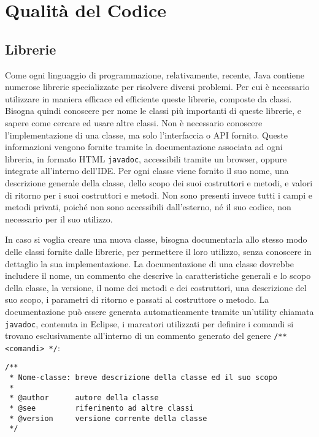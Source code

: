 \documentclass{article}
\numberwithin{equation}{subsection}
\begin{document}
\clearpage

\section{Qualità del Codice}

\subsection{Librerie}

Come ogni linguaggio di programmazione, relativamente, recente, Java contiene numerose librerie specializzate per risolvere diversi problemi. Per cui è necessario utilizzare in 
maniera efficace ed efficiente queste librerie, composte da classi. Bisogna quindi conoscere per nome le classi più importanti di queste librerie, e sapere come cercare ed usare 
altre classi. 
Non è necessario conoscere l'implementazione di una classe, ma solo l'interfaccia o API fornito. Queste informazioni vengono fornite tramite la documentazione associata ad ogni 
libreria, in formato HTML \verb|javadoc|, accessibili tramite un browser, oppure integrate all'interno dell'IDE. 
Per ogni classe viene fornito il suo nome, una descrizione generale della classe, dello scopo dei suoi costruttori e metodi, e valori di ritorno per i suoi costruttori e metodi. 
Non sono presenti invece tutti i campi e metodi privati, poiché non sono accessibili dall'esterno, né il suo codice, non necessario per il suo utilizzo. 

In caso si voglia creare una nuova classe, bisogna documentarla allo stesso modo delle classi fornite dalle librerie, per permettere il loro utilizzo, senza conoscere in 
dettaglio la sua implementazione. La documentazione di una classe dovrebbe includere il nome, un commento che descrive la caratteristiche generali e lo scopo della classe, la versione, 
il nome dei metodi e dei costruttori, una descrizione del suo scopo, i parametri di ritorno e passati al costruttore o metodo. 
La documentazione può essere generata automaticamente tramite un'utility chiamata \verb|javadoc|, contenuta in Eclipse, i marcatori utilizzati per definire i comandi si trovano 
esclusivamente all'interno  di un commento generato del genere \verb|/** <comandi> */|:
\begin{verbatim}
/**
 * Nome-classe: breve descrizione della classe ed il suo scopo
 * 
 * @author      autore della classe
 * @see         riferimento ad altre classi
 * @version     versione corrente della classe
 */  
\end{verbatim}
\end{document}
